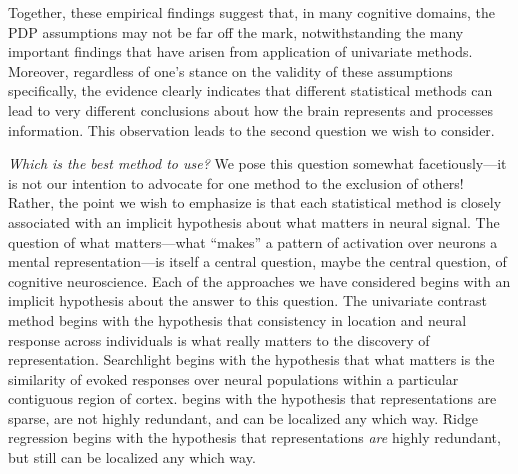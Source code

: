 Together, these empirical findings suggest that, in many cognitive domains, the PDP assumptions may not be far off the mark, notwithstanding the many important findings that have arisen from application of univariate methods. Moreover, regardless of one's stance on the validity of these assumptions specifically, the evidence clearly indicates that different statistical methods can lead to very different conclusions about how the brain represents and processes information. This observation leads to the second question we wish to consider.

{\em Which is the best method to use?} We pose this question somewhat facetiously---it is not our intention to advocate for one method to the exclusion of others! Rather, the point we wish to emphasize is that each statistical method is closely associated with an implicit hypothesis about what matters in neural signal. The question of what matters---what ``makes'' a pattern of activation over neurons a mental representation---is itself a central question, maybe the central question, of cognitive neuroscience. Each of the approaches we have considered begins with an implicit hypothesis about the answer to this question. The univariate contrast method begins with the hypothesis that consistency in location and neural response across individuals is what really matters to the discovery of representation. Searchlight begins with the hypothesis that what matters is the similarity of evoked responses over neural populations within a particular contiguous region of cortex. {\lasso} begins with the hypothesis that representations are sparse, are not highly redundant, and can be localized any which way. Ridge regression begins with the hypothesis that representations {\em are} highly redundant, but still can be localized any which way.

